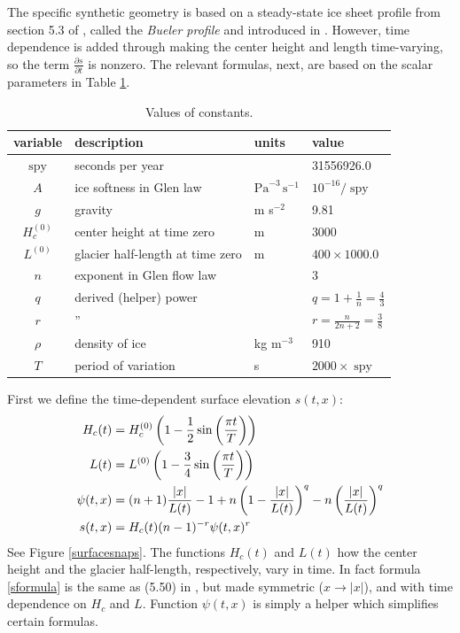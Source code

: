 \documentclass[letterpaper,final,12pt,reqno]{amsart}
\newcommand{\spy}{\operatorname{spy}}
\begin{document}
The specific synthetic geometry is based on a steady-state ice sheet profile from section 5.3 of \cite{vanderVeen2013}, called the \emph{Bueler profile} and introduced in \cite{Bueler2003}.  However, time dependence is added through making the center height and length time-varying, so the term $\frac{\partial s}{\partial t}$ is nonzero.  The relevant formulas, next, are based on the scalar parameters in Table \ref{constantstable}.

\begin{table}
\begin{tabular}{clll}
variable  & description & units & value \\
\hline
$\spy$ & seconds per year &  & 31556926.0 \\
$A$ & ice softness in Glen law & $\text{Pa}^{-3}\,\text{s}^{-1}$ & $10^{-16}/\spy$ \\
$g$ & gravity & m s$^{-2}$ & 9.81 \\
$H_c^{(0)}$ & center height at time zero & m & 3000 \\
$L^{(0)}$ & glacier half-length at time zero & m & $400 \times 1000.0$ \\
$n$ & exponent in Glen flow law & & 3 \\
$q$ & derived (helper) power & & $q = 1+\frac{1}{n} = \frac{4}{3}$ \\
$r$ & \qquad '' & & $r = \frac{n}{2n+2} = \frac{3}{8}$ \\
$\rho$ & density of ice & kg m$^{-3}$ & 910 \\
$T$ & period of variation & s & $2000 \times \spy$
\end{tabular}
\bigskip
\caption{Values of constants.}
\label{constantstable}
\end{table}

First we define the time-dependent surface elevation $s(t,x)$:
\begin{align}
H_c(t) &= H_c^{(0)} \left(1 - \frac{1}{2} \sin\left(\frac{\pi t}{T}\right)\right) \notag \\
L(t) &= L^{(0)} \left(1 - \frac{3}{4} \sin\left(\frac{\pi t}{T}\right)\right) \notag\\
\psi(t,x) &= (n+1) \frac{|x|}{L(t)} - 1 + n \left(1 - \frac{|x|}{L(t)}\right)^q - n \left(\frac{|x|}{L(t)}\right)^q \notag \\
s(t,x) &= H_c(t) (n-1)^{-r} \psi(t,x)^r \label{sformula}
\end{align}
See Figure \ref{surfacesnaps}.  The functions $H_c(t)$ and $L(t)$ how the center height and the glacier half-length, respectively, vary in time.  In fact formula \eqref{sformula} is the same as (5.50) in \cite{vanderVeen2013}, but made symmetric ($x \to |x|$), and with time dependence on $H_c$ and $L$.  Function $\psi(t,x)$ is simply a helper which simplifies certain formulas.
\end{document}
